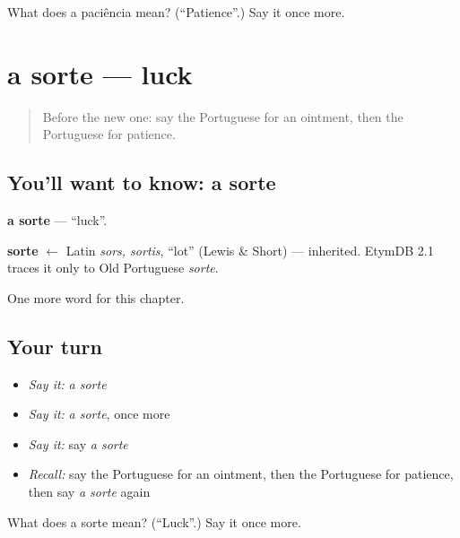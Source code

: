 \begin{tcolorbox}[breakable,colback=teal!4,colframe=teal!35!black,title={Before you move on}]
What does a paciência mean? (\textquotedblleft{}Patience\textquotedblright{}.) Say it once more.
\end{tcolorbox}
\section[a sorte]{a sorte — luck}

\label{lesson:PT-C211-sorte}



\begin{quote}
Before the new one: say the Portuguese for an ointment, then the Portuguese for patience.
\end{quote}

\subsection*{You'll want to know: a sorte}
\textbf{a sorte} — \textquotedblleft{}luck\textquotedblright{}.

\begin{cousinweb}
\textbf{sorte} $\leftarrow$ Latin \emph{sors, sortis}, \textquotedblleft{}lot\textquotedblright{} (Lewis \& Short) — inherited. EtymDB 2.1 traces it only to Old Portuguese \emph{sorte}.
\end{cousinweb}

\begin{grammarlens}[title={What you've built}]
One more word for this chapter.
\end{grammarlens}

\subsection*{Your turn}
\begin{itemize}
\raggedright
  \item \emph{Say it:} \emph{a sorte}
  \item \emph{Say it:} \emph{a sorte}, once more
  \item \emph{Say it:} say \emph{a sorte}
  \item \emph{Recall:} say the Portuguese for an ointment, then the Portuguese for patience, then say \emph{a sorte} again
\end{itemize}

\begin{tcolorbox}[breakable,colback=teal!4,colframe=teal!35!black,title={Before you move on}]
What does a sorte mean? (\textquotedblleft{}Luck\textquotedblright{}.) Say it once more.
\end{tcolorbox}
